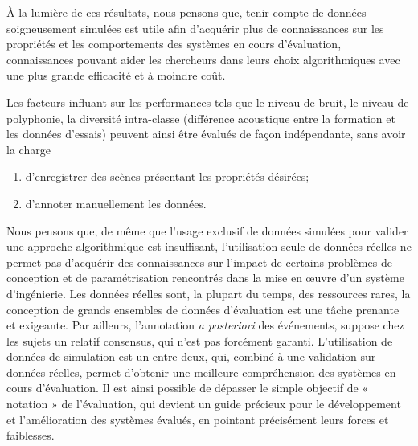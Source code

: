 À la lumière de ces résultats, nous pensons que, tenir compte de données soigneusement simulées est utile afin d'acquérir plus de connaissances sur les propriétés et les comportements des systèmes en cours d'évaluation, connaissances pouvant aider les chercheurs dans leurs choix algorithmiques avec une plus grande efficacité et à moindre coût.  

Les facteurs influant sur les performances tels que le niveau de bruit, le niveau de polyphonie, la diversité intra-classe (différence acoustique entre la formation et les données d'essais) peuvent ainsi être évalués de façon indépendante, sans avoir la charge 

\begin{enumerate}
\item d'enregistrer des scènes présentant les propriétés désirées;
\item d'annoter manuellement les données.
\end{enumerate}

Nous pensons que, de même que l'usage exclusif de données simulées pour valider une approche algorithmique est insuffisant, l'utilisation seule de données réelles ne permet pas d'acquérir des connaissances sur l'impact de certains problèmes de conception et de paramétrisation rencontrés dans la mise en œuvre d'un système d'ingénierie. Les données réelles sont, la plupart du temps, des ressources rares, la conception  de grands ensembles de données d'évaluation est une tâche prenante et exigeante. Par ailleurs, l'annotation \emph{a posteriori} des événements, suppose chez les sujets un relatif consensus, qui n'est pas forcément garanti. L'utilisation de données de simulation est un entre deux, qui, combiné à une validation sur données réelles, permet d'obtenir une meilleure compréhension des systèmes en cours d'évaluation. Il est ainsi possible de dépasser le simple objectif de « notation » de l'évaluation, qui devient un guide précieux pour le développement et l'amélioration des systèmes évalués, en pointant précisément leurs forces et faiblesses.





